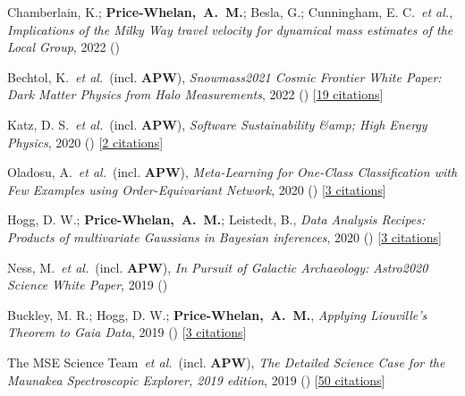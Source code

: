 \item[{\color{deemph}\scriptsize11}]Chamberlain, K.; \textbf{Price-Whelan,~A.~M.}; Besla, G.; Cunningham, E. C.~\textit{et al.}, \textit{Implications of the Milky Way travel velocity for dynamical mass estimates of the Local Group}, 2022 ()

\item[{\color{deemph}\scriptsize10}]Bechtol, K.~\textit{et al.}~(incl. \textbf{APW}), \textit{Snowmass2021 Cosmic Frontier White Paper: Dark Matter Physics from Halo Measurements}, 2022 () [\href{http://adsabs.harvard.edu/abs/2022arXiv220307354B}{19 citations}]

\item[{\color{deemph}\scriptsize9}]Katz, D. S.~\textit{et al.}~(incl. \textbf{APW}), \textit{Software Sustainability {\&}amp; High Energy Physics}, 2020 () [\href{http://adsabs.harvard.edu/abs/2020arXiv201005102K}{2 citations}]

\item[{\color{deemph}\scriptsize8}]Oladosu, A.~\textit{et al.}~(incl. \textbf{APW}), \textit{Meta-Learning for One-Class Classification with Few Examples using Order-Equivariant Network}, 2020 () [\href{http://adsabs.harvard.edu/abs/2020arXiv200704459O}{3 citations}]

\item[{\color{deemph}\scriptsize7}]Hogg, D. W.; \textbf{Price-Whelan,~A.~M.}; Leistedt, B., \textit{Data Analysis Recipes: Products of multivariate Gaussians in Bayesian inferences}, 2020 () [\href{http://adsabs.harvard.edu/abs/2020arXiv200514199H}{3 citations}]

\item[{\color{deemph}\scriptsize6}]Ness, M.~\textit{et al.}~(incl. \textbf{APW}), \textit{In Pursuit of Galactic Archaeology: Astro2020 Science White Paper}, 2019 ()

\item[{\color{deemph}\scriptsize5}]Buckley, M. R.; Hogg, D. W.; \textbf{Price-Whelan,~A.~M.}, \textit{Applying Liouville's Theorem to Gaia Data}, 2019 () [\href{http://adsabs.harvard.edu/abs/2019arXiv190700987B}{3 citations}]

\item[{\color{deemph}\scriptsize4}]The MSE Science Team~\textit{et al.}~(incl. \textbf{APW}), \textit{The Detailed Science Case for the Maunakea Spectroscopic Explorer, 2019 edition}, 2019 () [\href{http://adsabs.harvard.edu/abs/2019arXiv190404907T}{50 citations}]


